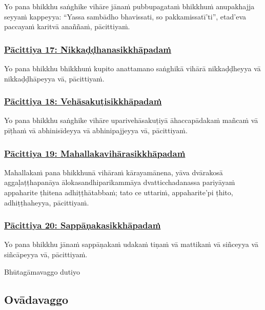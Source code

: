 Yo pana bhikkhu saṅghike vihāre jānaṁ pubbupagataṁ bhikkhuṁ anupakhajja seyyaṁ kappeyya: ``Yassa sambādho bhavissati, so pakkamissatī'ti'', etad'eva paccayaṁ karitvā anaññaṁ, pācittiyaṁ.

\subsubsection*{\hyperref[exp17]{Pācittiya 17: Nikkaḍḍhanasikkhāpadaṁ}}
\label{pac17}

Yo pana bhikkhu bhikkhuṁ kupito anattamano saṅghikā vihārā nikkaḍḍheyya vā nikkaḍḍhāpeyya vā, pācittiyaṁ.

\subsubsection*{\hyperref[exp18]{Pācittiya 18: Vehāsakuṭisikkhāpadaṁ}}
\label{pac18}

Yo pana bhikkhu saṅghike vihāre uparivehāsakuṭiyā āhaccapādakaṁ mañcaṁ vā pīṭhaṁ vā abhinisīdeyya vā abhinipajjeyya vā, pācittiyaṁ.

\subsubsection*{\hyperref[exp19]{Pācittiya 19: Mahallakavihārasikkhāpadaṁ}}
\label{pac19}

Mahallakaṁ pana bhikkhunā vihāraṁ kārayamānena, yāva dvārakosā aggaḷaṭṭhapanāya ālokasandhiparikammāya dvatticchadanassa pariyāyaṁ appaharite ṭhitena adhiṭṭhātabbaṁ; tato ce uttariṁ, appaharite'pi ṭhito, adhiṭṭhaheyya, pācittiyaṁ.

\subsubsection*{\hyperref[exp20]{Pācittiya 20: Sappāṇakasikkhāpadaṁ}}
\label{pac20}

Yo pana bhikkhu jānaṁ sappāṇakaṁ udakaṁ tiṇaṁ vā mattikaṁ vā siñceyya vā siñcāpeyya vā, pācittiyaṁ.

\begin{center}
  Bhūtagāmavaggo dutiyo
\end{center}

\subsection{Ovādavaggo}
\vspace{0.2cm}

